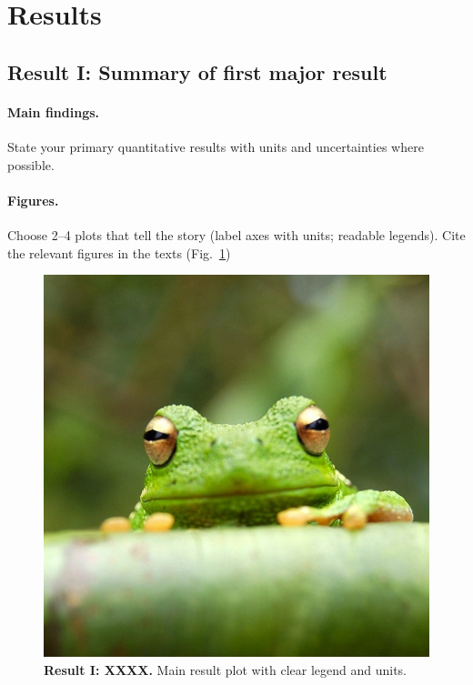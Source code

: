 \documentclass[reprint, superscriptaddress, aps]{revtex4-2}
\begin{document}
\section{Results}

\subsection{Result I: Summary of first major result}
\paragraph*{Main findings.} State your primary quantitative results with units and uncertainties where possible.

\paragraph*{Figures.} Choose 2--4 plots that tell the story (label axes with units; readable legends). Cite the relevant figures in the texts (Fig.~\ref{fig:main_1})
\begin{figure}[h]
  \centering
  \includegraphics[width=\linewidth]{frog.jpg}
  \caption{\textbf{Result I: XXXX.} Main result plot with clear legend and units.}
  \label{fig:main_1}
\end{figure}
\end{document}
